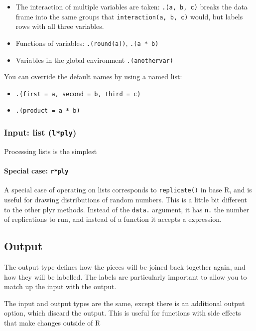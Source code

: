 \documentclass[letterpage]{scrartcl}
\newcommand{\code}[1]{\lstinline!#1!}
\newcommand{\f}[1]{\lstinline!#1()!}
\begin{document}
\begin{itemize}
  \item The interaction of multiple variables are taken: {\tt .(a, b, c)} breaks the data frame into the same groups that  \code{interaction(a, b, c)} would, but labels rows with all three variables.
  
  \item Functions of variables: {\tt .(round(a))}, {\tt .(a * b)}
  
  \item Variables in the global environment {\tt .(anothervar)}
\end{itemize}

You can override the default names by using a named list:
\begin{itemize}
  \item \code{.(first = a, second = b, third = c)}
  \item \code{.(product = a * b)}
\end{itemize}

\subsubsection{Input: list (\code{l*ply})} 

Processing lists is the simplest   

\paragraph{Special case: \code{r*ply}}  A special case of operating on lists corresponds to \f{replicate} in base R, and is useful for drawing distributions of random numbers.  This is a little bit different to the other plyr methods.  Instead of the \code{data.} argument, it has \code{n.} the number of replications to run, and instead of a function it accepts a expression.  

\subsection{Output}
\label{sec:output}

The output type defines how the pieces will be joined back together again, and how they will be labelled.  The labels are particularly important to allow you to match up the input with the output.

The input and output types are the same, except there is an additional output option, which discard the output.  This is useful for functions with side effects that make changes outside of R
\end{document}
